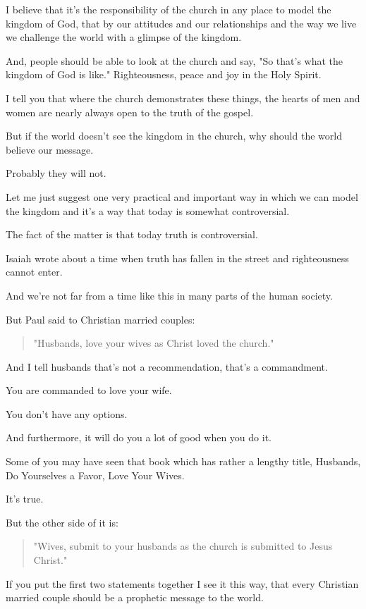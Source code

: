 \documentclass[11pt]{article}
\begin{document}
I believe that it's the responsibility of the
church in any place to model the kingdom of
God, that by our attitudes and our
relationships and the way we live we challenge
the world with a glimpse of the kingdom.

And, people should be able to look at the
church and say, "So that's what the kingdom of
God is like." Righteousness, peace and joy in
the Holy Spirit.

I tell you that where the church demonstrates
these things, the hearts of men and women are
nearly always open to the truth of the gospel.

But if the world doesn't see the kingdom in
the church, why should the world believe our
message.

Probably they will not.

Let me just suggest one very practical and
important way in which we can model the
kingdom and it's a way that today is somewhat
controversial.

The fact of the matter is that today truth is
controversial.

Isaiah wrote about a time when truth has
fallen in the street and righteousness cannot
enter.

And we're not far from a time like this in
many parts of the human society.

But Paul said to Christian married couples:

\begin{quote}
"Husbands, love your wives as Christ loved the
church."
\end{quote}

And I tell husbands that's not a
recommendation, that's a commandment.

You are commanded to love your wife.

You don't have any options.

And furthermore, it will do you a lot of good
when you do it.

Some of you may have seen that book which has
rather a lengthy title, Husbands, Do
Yourselves a Favor, Love Your Wives.

It's true.

But the other side of it is:

\begin{quote}
"Wives, submit to your husbands as the church is submitted to Jesus Christ."
\end{quote}

If you put the first two statements together I
see it this way, that every Christian married
couple should be a prophetic message to the
world.
\end{document}
